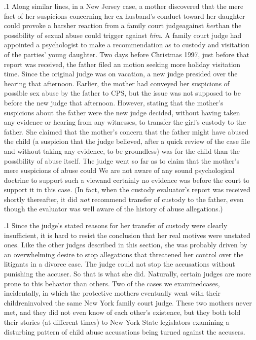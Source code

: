 \documentclass[11pt, twoside]{article}
\begin{document}
{\p.1{%
Along similar lines, in a New Jersey case, a mother discovered that
the mere fact of her suspicions concerning her ex-husband’s conduct
toward her daughter could provoke a harsher reaction from a family
court judge\mdash{}against \textit{her}\mdash{}than the possibility of sexual abuse could
trigger against \textit{him}. A family court judge had appointed a psychologist
to make a recommendation as to custody and visitation of the parties’
young daughter. Two days before Christmas 1997, just before that report was received, the father filed an  motion seeking more
holiday visitation time. Since the original judge was on vacation, a new
judge presided over the  hearing that afternoon. Earlier, the
mother had conveyed her suspicions of possible sex abuse by the father
to CPS, but the issue was not supposed to be before the new judge that
afternoon. However, stating that the mother’s suspicions about the
father were  the new judge decided, without having taken any
evidence or hearing from any witnesses, to transfer the girl’s custody to
the father. She claimed that the mother’s concern that the father might
have abused the child (a suspicion that the judge believed, after a quick
review of the case file and without taking any evidence, to be groundless) was  for the child than the possibility of abuse itself. The
judge went so far as to claim that the mother’s mere suspicions of abuse
could  We are not aware of any sound psychological doctrine to support such a view\mdash{}and certainly no evidence
was before the court to support it in this case. (In fact, when the custody
evaluator’s report was received shortly thereafter, it did \textit{not} recommend
transfer of custody to the father, even though the evaluator was well
aware of the history of abuse allegations.)
}%

\p.1{%
Since the judge’s stated reasons for her transfer of custody were clearly
insufficient, it is hard to resist the conclusion that her real motives
were unstated ones. Like the other judges described in this section, she
was probably driven by an overwhelming desire to stop allegations that
threatened her control over the litigants in a divorce case. The judge
could not stop the accusations without punishing the accuser. So that is
what she did.
Naturally, certain judges are more prone to this behavior than others.
Two of the cases we examined\mdash{}cases, incidentally, in which the protective mothers eventually went  with
their children\mdash{}involved the same New York family court judge. These two mothers
never met, and they did not even know of each other’s existence, but
they both told their stories (at different times) to New York State legislators examining a disturbing pattern of child abuse accusations being
turned against the accusers.
}%

}
\end{document}
